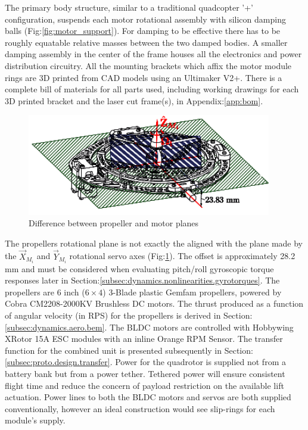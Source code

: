 \par
The primary body structure, similar to a traditional quadcopter '+' configuration, suspends each motor rotational assembly with silicon damping balls (Fig:\ref{fig:motor_support}). For damping to be effective there has to be roughly equatable relative masses between the two damped bodies. A smaller damping assembly in the center of the frame houses all the electronics and power distribution circuitry. All the mounting brackets which affix the motor module rings are 3D printed from CAD models using an Ultimaker V2+\cite{ultimaker}. There is a complete bill of materials for all parts used, including working drawings for each 3D printed bracket and the laser cut frame(s), in Appendix:\ref{app:bom}.
\par
\begin{figure}[hbtp]
\centering
\includegraphics[width=0.95\textwidth]{figs/motor-prop}
\caption{Difference between propeller and motor planes}
\label{fig:motor_prop}
\end{figure}
The propellers rotational plane is not exactly the aligned with the plane made by the $\vec{X}_{M_i}$ and $\vec{Y}_{M_i}$ rotational servo axes (Fig:\ref{fig:motor_prop}). The offset is approximately 28.2 mm and must be considered when evaluating pitch/roll gyroscopic torque responses later in Section:\ref{subsec:dynamics.nonlinearities.gyrotorques}. The propellers are 6 inch ($6 \times 4$) 3-Blade plastic Gemfam propellers, powered by Cobra CM2208-2000KV Brushless DC motors. The thrust produced as a function of angular velocity (in RPS) for the propellers is derived in Section:\ref{subsec:dynamics.aero.bem}. 
\newpage
The BLDC motors are controlled with Hobbywing XRotor 15A ESC modules with an inline Orange RPM Sensor. The transfer function for the combined unit is presented subsequently in Section:\ref{subsec:proto.design.transfer}. Power for the quadrotor is supplied not from a battery bank but from a power tether. Tethered power will ensure consistent flight time and reduce the concern of payload restriction on the available lift actuation. Power lines to both the BLDC motors and servos are both supplied conventionally, however an ideal construction would see slip-rings for each module's supply. 
